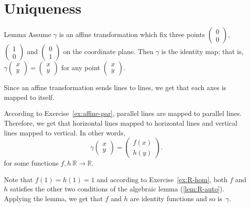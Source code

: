 \section*{Uniqueness}

\begin{thm}{Lemma}\label{lem:3-fix}
Assume $\gamma$ is an affine transformation which fix three points $\left(\begin{smallmatrix}
0\\ 0
\end{smallmatrix} \right)$, 
$\left(\begin{smallmatrix}
1\\ 0
\end{smallmatrix} \right)$ 
and $\left(\begin{smallmatrix}
0\\ 1
\end{smallmatrix} \right)$ on the coordinate plane.
Then $\gamma$ is the identity map; 
that is, $\gamma\left(\begin{smallmatrix}
x\\ y
\end{smallmatrix} \right)
=
\left(\begin{smallmatrix}
x\\ y
\end{smallmatrix} \right)$ for any point $\left(\begin{smallmatrix}
x\\ y
\end{smallmatrix} \right)$.
\end{thm}

Since an affine transformation sends lines to lines, we get that each axes is mapped to itself.

According to Exercise~\ref{ex:affine-par}, 
parallel lines are mapped to parallel lines.
Therefore, we get that horizontal lines mapped to horizontal lines 
and
vertical lines mapped to vertical.
In other words,
\[\gamma\left(\begin{smallmatrix}
x\\ y
\end{smallmatrix} \right)
=
\left(\begin{smallmatrix}
f(x)\\ h(y)
\end{smallmatrix} \right).\]
for some functions $f,h\:\mathbb{R}\to\mathbb{R}$.

Note that $f(1)=h(1)=1$ and according to 
Exercise~\ref{ex:R-hom}, 
both $f$ and $h$ satisfies the other two conditions of the algebraic lemma (\ref{lem:R-auto}).
Applying the lemma, we get that $f$ and $h$ 
are identity functions
and so is~$\gamma$.
\qeds

